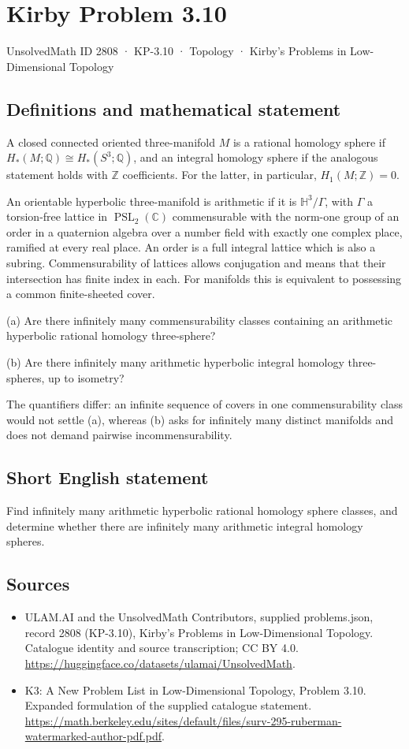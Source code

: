 \documentclass[11pt,a4paper]{article}
\begin{document}
\section*{Kirby Problem 3.10}\label{2808}
{\small UnsolvedMath ID 2808 · KP-3.10 · Topology · Kirby's Problems in Low-Dimensional Topology}
\subsection{Definitions and mathematical statement}
A closed connected oriented three-manifold $M$ is a rational homology sphere
if $H_*(M;\mathbb Q)\cong H_*(S^3;\mathbb Q)$, and an integral homology sphere
if the analogous statement holds with $\mathbb Z$ coefficients.
For the latter, in particular, $H_1(M;\mathbb Z)=0$.

An orientable hyperbolic three-manifold is arithmetic if it is
$\mathbb H^3/\Gamma$, with $\Gamma$ a torsion-free lattice in
$\operatorname{PSL}_2(\mathbb C)$ commensurable with the norm-one group of
an order in a quaternion algebra over a number field with exactly one complex
place, ramified at every real place. An order is a full integral lattice which
is also a subring. Commensurability of lattices allows conjugation and means
that their intersection has finite index in each. For manifolds this is
equivalent to possessing a common finite-sheeted cover.

(a) Are there infinitely many commensurability classes containing an
arithmetic hyperbolic rational homology three-sphere?

(b) Are there infinitely many arithmetic hyperbolic integral homology
three-spheres, up to isometry?

The quantifiers differ: an infinite sequence of covers in one commensurability
class would not settle (a), whereas (b) asks for infinitely many distinct
manifolds and does not demand pairwise incommensurability.
\subsection{Short English statement}
Find infinitely many arithmetic hyperbolic rational homology sphere classes, and determine whether there are infinitely many arithmetic integral homology spheres.
\subsection{Sources}
\begin{itemize}
\item[S1] ULAM.AI and the UnsolvedMath Contributors, supplied problems.json, record 2808 (KP-3.10), Kirby's Problems in Low-Dimensional Topology. Catalogue identity and source transcription; CC BY 4.0.
\url{https://huggingface.co/datasets/ulamai/UnsolvedMath}.
\item[S2] K3: A New Problem List in Low-Dimensional Topology, Problem 3.10. Expanded formulation of the supplied catalogue statement.
\url{https://math.berkeley.edu/sites/default/files/surv-295-ruberman-watermarked-author-pdf.pdf}.
\end{itemize}
\end{document}
